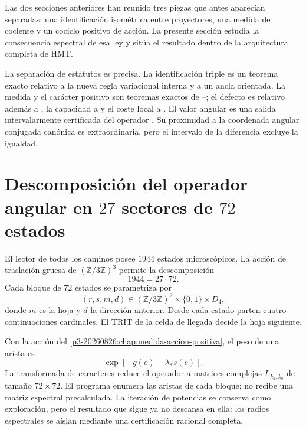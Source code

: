 \label{p3-20260826:chap:operador-angular-dictamen}

Las dos secciones anteriores han reunido tres piezas que antes aparecían
separadas: una identificación isométrica entre proyectores, una medida de
cociente y un cociclo positivo de acción. La presente sección estudia la consecuencia
espectral de esa ley y sitúa el resultado dentro de la arquitectura completa
de HMT\@.

La separación de estatutos es precisa. La identificación triple es un teorema
exacto relativo a la nueva regla variacional interna y a un ancla orientada.
La medida y el carácter positivo son teoremas exactos de \HTr--\HAdd; el defecto
es relativo además a \HDef, la capacidad a \HRes y el coste local a \HLoc. El valor
angular es una salida intervalarmente certificada del operador \Gtr. Su
proximidad a la coordenada angular conjugada canónica es extraordinaria, pero el intervalo de
la diferencia excluye la igualdad.

\section{Descomposición del operador angular en \(27\) sectores de \(72\) estados}

El lector de todos los caminos \Gtr posee \(1944\) estados microscópicos. La
acción de traslación gruesa de \((\mathbb Z/3\mathbb Z)^3\) permite la
descomposición
\[
 1944=27\cdot72.
\]
Cada bloque de \(72\) estados se parametriza por
\[
 (r,s,m,d)
 \in(\mathbb Z/3\mathbb Z)^2\times\{0,1\}\times D_4,
\]
donde \(m\) es la hoja y \(d\) la dirección anterior. Desde cada estado
parten cuatro continuaciones cardinales. El TRIT de la celda de llegada
decide la hoja siguiente.

Con la acción del \cref{p3-20260826:chap:medida-accion-positiva}, el peso de una arista
es
\[
 \exp[-g(e)-\lambda_*s(e)].
\]
La transformada de caracteres reduce el operador a matrices complejas
\(L_{k_a,k_b}\) de tamaño \(72\times72\). El programa enumera las
aristas de cada bloque; no recibe una matriz espectral precalculada. La
iteración de potencias se conserva como exploración, pero el resultado que
sigue ya no descansa en ella: los radios espectrales se aíslan mediante una
certificación racional completa.


